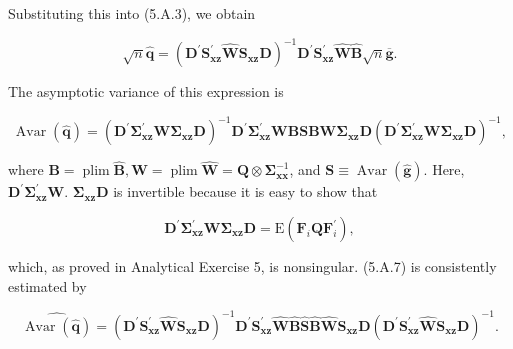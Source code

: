 \documentclass[10pt]{article}
\begin{document}
Substituting this into (5.A.3), we obtain


\begin{equation*}
\sqrt{n} \hat{\mathbf{q}}=\left(\mathbf{D}^{\prime} \mathbf{S}_{\mathbf{x z}}^{\prime} \widehat{\mathbf{W}} \mathbf{S}_{\mathbf{x z}} \mathbf{D}\right)^{-1} \mathbf{D}^{\prime} \mathbf{S}_{\mathbf{x z}}^{\prime} \widehat{\mathbf{W}} \widehat{\mathbf{B}} \sqrt{n} \overline{\mathbf{g}} . \tag{5.A.6}
\end{equation*}


The asymptotic variance of this expression is


\begin{equation*}
\operatorname{Avar}(\hat{\mathbf{q}})=\left(\mathbf{D}^{\prime} \boldsymbol{\Sigma}_{\mathbf{x z}}^{\prime} \mathbf{W} \boldsymbol{\Sigma}_{\mathbf{x z}} \mathbf{D}\right)^{-1} \mathbf{D}^{\prime} \boldsymbol{\Sigma}_{\mathbf{x z}}^{\prime} \mathbf{W} \mathbf{B} \mathbf{S} \mathbf{B W} \boldsymbol{\Sigma}_{\mathbf{x z}} \mathbf{D}\left(\mathbf{D}^{\prime} \boldsymbol{\Sigma}_{\mathbf{x z}}^{\prime} \mathbf{W} \boldsymbol{\Sigma}_{\mathbf{x z}} \mathbf{D}\right)^{-1}, \tag{5.A.7}
\end{equation*}


where $\mathbf{B}=\operatorname{plim} \widehat{\mathbf{B}}, \mathbf{W}=\operatorname{plim} \widehat{\mathbf{W}}=\mathbf{Q} \otimes \boldsymbol{\Sigma}_{\mathbf{x x}}^{-1}$, and $\mathbf{S} \equiv \operatorname{Avar}(\hat{\mathbf{g}})$. Here, $\mathbf{D}^{\prime} \boldsymbol{\Sigma}_{\mathbf{x z}}^{\prime} \mathbf{W}$. $\boldsymbol{\Sigma}_{\mathbf{x z}} \mathbf{D}$ is invertible because it is easy to show that


\begin{equation*}
\mathbf{D}^{\prime} \boldsymbol{\Sigma}_{\mathbf{x z}}^{\prime} \mathbf{W} \boldsymbol{\Sigma}_{\mathbf{x z}} \mathbf{D}=\mathrm{E}\left(\mathbf{F}_{i} \mathbf{Q} \mathbf{F}_{i}^{\prime}\right), \tag{5.A.8}
\end{equation*}


which, as proved in Analytical Exercise 5, is nonsingular. (5.A.7) is consistently estimated by


\begin{equation*}
\widehat{\operatorname{Avar}(\hat{\mathbf{q}})}=\left(\mathbf{D}^{\prime} \mathbf{S}_{\mathbf{x z}}^{\prime} \widehat{\mathbf{W}} \mathbf{S}_{\mathbf{x z}} \mathbf{D}\right)^{-1} \mathbf{D}^{\prime} \mathbf{S}_{\mathbf{x z}}^{\prime} \widehat{\mathbf{W}} \widehat{\mathbf{B}} \widehat{\mathbf{S}} \widehat{\mathbf{B}} \widehat{\mathbf{W}} \mathbf{S}_{\mathbf{x z}} \mathbf{D}\left(\mathbf{D}^{\prime} \mathbf{S}_{\mathbf{x z}}^{\prime} \widehat{\mathbf{W}} \mathbf{S}_{\mathbf{x z}} \mathbf{D}\right)^{-1} . \tag{5.A.9}
\end{equation*}
\end{document}
